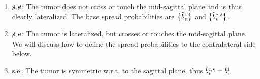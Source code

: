 \documentclass[\relativeRoot/main.tex]{subfiles}
\begin{document}
\begin{enumerate}
    \item $\centernot{\text{s}} , \centernot{\text{e}}$: The tumor does not cross or touch the mid-sagittal plane and is thus clearly lateralized. The base spread probabilities are $\big\{ \Tilde{b}_v^\text{i} \big\}$ and $\big\{ \Tilde{b}_v^{\text{c},\centernot{\text{e}}} \big\}$.
    \item $\centernot{\text{s}} , \text{e}$: The tumor is lateralized, but crosses or touches the mid-sagittal plane. We will discuss how to define the spread probabilities to the contralateral side below.
    \item $\text{s} , \text{e}$: The tumor is symmetric w.r.t. to the sagittal plane, thus $\Tilde{b}_v^{\text{c},\text{s}} = \Tilde{b}_v^\text{i}$
\end{enumerate}
\end{document}
